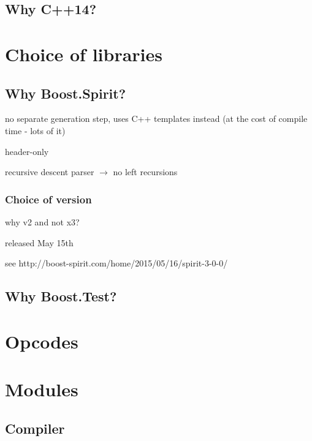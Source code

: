        \subsection{Why C++14?}
    
    \section{Choice of libraries}
        \subsection{Why Boost.Spirit?}
            no separate generation step, uses C++ templates instead (at the cost of compile time - lots of it)
            
            header-only
            
            recursive descent parser $\rightarrow$ no left recursions
            \subsubsection{Choice of version}
                why v2 and not x3?
                
                released May 15th
                
                see http://boost-spirit.com/home/2015/05/16/spirit-3-0-0/
        \subsection{Why Boost.Test?}
    
    
    \section{Opcodes}
    
    
    \section{Modules}
    
    
        \subsection{Compiler}
        
